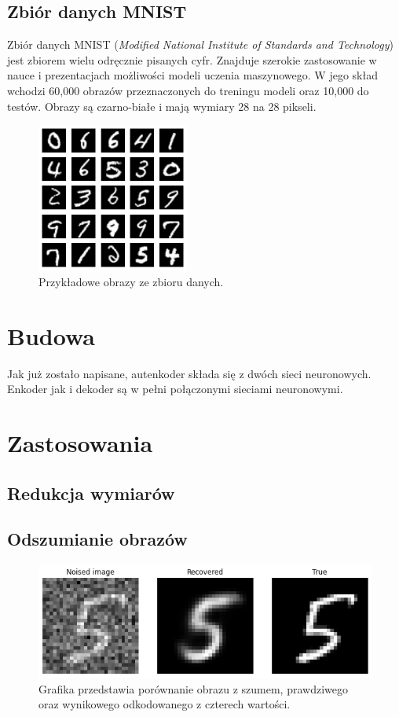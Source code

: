 \documentclass[a4paper,12pt]{book} %
\begin{document}
\subsection{Zbiór danych MNIST}
Zbiór danych MNIST (\textit{Modified National Institute of Standards and Technology})\cite{mnist} jest zbiorem wielu odręcznie pisanych cyfr. Znajduje szerokie zastosowanie w nauce i prezentacjach możliwości modeli uczenia maszynowego. W jego skład wchodzi 60,000 obrazów przeznaczonych do treningu modeli oraz 10,000 do testów. Obrazy są czarno-białe i mają wymiary 28 na 28 pikseli.
\begin{figure}[h]
	\centering\includegraphics[width=5cm]{pictures/mnist.png}
	\caption{Przykładowe obrazy ze zbioru danych.}
\end{figure}
\section{Budowa}
Jak już zostało napisane, autenkoder składa się z dwóch sieci neuronowych. Enkoder jak i dekoder są w pełni połączonymi sieciami neuronowymi. \\
\section{Zastosowania}
\subsection{Redukcja wymiarów}
\lipsum[1]
\subsection{Odszumianie obrazów}
\lipsum[2]
\begin{figure}[h]
	\centering\includegraphics[width=14.5cm]{pictures/noised1.png}
	\caption{Grafika przedstawia porównanie obrazu z szumem, prawdziwego oraz wynikowego odkodowanego z czterech wartości.}
\end{figure}
\end{document}
